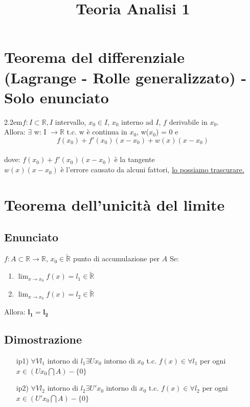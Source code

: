 \documentclass{article}
\title{Teoria Analisi 1}
\newcommand{\R}{\mathbb{R}}
\newcommand{\Rext}{\widetilde{\mathbb{R}}}
\begin{document}
\maketitle
\tableofcontents\newpage

\begin{flushleft}

\section{Teorema del differenziale (Lagrange - Rolle generalizzato) - Solo enunciato}
{2.2em}$f: I \subset \R, I$ intervallo, $x_0 \in I$, $x_0$ interno ad $I$, $f$ derivabile in $x_0$.
\\Allora: $\exists$ w: I $\rightarrow \R$ t.c. w è continua in $x_0$, w($x_0$) = 0 e
\[
    f(x_0) + f'(x_0)(x-x_0)+w(x)(x-x_0)
\]
\\dove: $f(x_0) + f'(x_0)(x-x_0)$ è la tangente
\\\hspace{2.3em} $w(x)(x-x_0)$ è l'errore causato da alcuni fattori, \underline{lo possiamo trascurare.}


\section{Teorema dell'unicità del limite}
\subsection{Enunciato}
$f: A \subset \R \rightarrow \R$, $x_0 \in \Rext$ punto di accumulazione per $A$
Se:
\begin{enumerate}
    \item $\lim_{x \to x_0} f(x) = l_1 \in \Rext$
    \item $\lim_{x \to x_0} f(x) = l_2 \in \Rext$
\end{enumerate}
Allora: $\mathbf{l_1 = l_2}$

\subsection{Dimostrazione}

\begin{enumerate}
    \item[ip1)] $\forall V l_1 $ intorno di $l_1 \exists U x_0$ intorno di $x_0$ t.c. $f(x)\in\forall l_1 $ per ogni $x\in (U x_0 \bigcap A) - \{0\}$
    \item[ip2)] $\forall V l_2 $ intorno di $l_2 \exists U' x_0$ intorno di $x_0$ t.c. $f(x)\in\forall l_2 $ per ogni $x\in (U' x_0 \bigcap A) - \{0\}$
\end{enumerate}


\end{flushleft}
\end{document}
